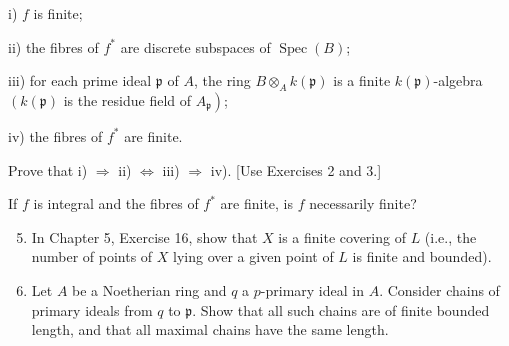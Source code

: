 \documentclass{standalone}
\theoremstyle{definition}
\theoremstyle{remark}
\begin{document}
i) $f$ is finite;

ii) the fibres of $f^{*}$ are discrete subspaces of $\operatorname{Spec}(B)$;

iii) for each prime ideal $\mathfrak{p}$ of $A$, the ring $B \otimes_{A} k(\mathfrak{p})$ is a finite $k(\mathfrak{p})$-algebra $\left(k(\mathfrak{p})\right.$ is the residue field of $\left.A_{\mathfrak{p}}\right)$;

iv) the fibres of $f^{*}$ are finite.

Prove that i) $\Rightarrow$ ii) $\Leftrightarrow$ iii) $\Rightarrow$ iv). [Use Exercises 2 and 3.]

If $f$ is integral and the fibres of $f^{*}$ are finite, is $f$ necessarily finite?

\begin{enumerate}
  \setcounter{enumi}{4}
  \item In Chapter 5, Exercise 16, show that $X$ is a finite covering of $L$ (i.e., the number of points of $X$ lying over a given point of $L$ is finite and bounded).

  \item Let $A$ be a Noetherian ring and $q$ a $p$-primary ideal in $A$. Consider chains of primary ideals from $q$ to $\mathfrak{p}$. Show that all such chains are of finite bounded length, and that all maximal chains have the same length.

\end{enumerate}
\end{document}
